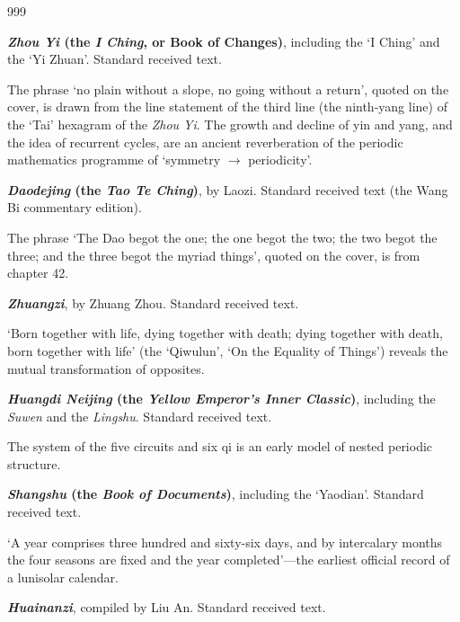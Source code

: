 \newpage

\cleardoublepage
{}
{}

\begingroup
\sloppy
\setlength{\emergencystretch}{3em}

\begin{thebibliography}{999}

 \textbf{\textit{Zhou Yi} (the \textit{I Ching}, or Book of Changes)}, including the `I Ching' and the `Yi Zhuan'. Standard received text.

The phrase `no plain without a slope, no going without a return', quoted on the cover, is drawn from the line statement of the third line (the ninth-yang line) of the `Tai' hexagram of the \textit{Zhou Yi}. The growth and decline of yin and yang, and the idea of recurrent cycles, are an ancient reverberation of the periodic mathematics programme of `symmetry $\to$ periodicity'.

 \textbf{\textit{Daodejing} (the \textit{Tao Te Ching})}, by Laozi. Standard received text (the Wang Bi commentary edition).

The phrase `The Dao begot the one; the one begot the two; the two begot the three; and the three begot the myriad things', quoted on the cover, is from chapter 42.

 \textbf{\textit{Zhuangzi}}, by Zhuang Zhou. Standard received text.

`Born together with life, dying together with death; dying together with death, born together with life' (the `Qiwulun', `On the Equality of Things') reveals the mutual transformation of opposites.

 \textbf{\textit{Huangdi Neijing} (the \textit{Yellow Emperor's Inner Classic})}, including the \textit{Suwen} and the \textit{Lingshu}. Standard received text.

The system of the five circuits and six qi is an early model of nested periodic structure.

 \textbf{\textit{Shangshu} (the \textit{Book of Documents})}, including the `Yaodian'. Standard received text.

`A year comprises three hundred and sixty-six days, and by intercalary months the four seasons are fixed and the year completed'---the earliest official record of a lunisolar calendar.

 \textbf{\textit{Huainanzi}}, compiled by Liu An. Standard received text.


\end{thebibliography}
